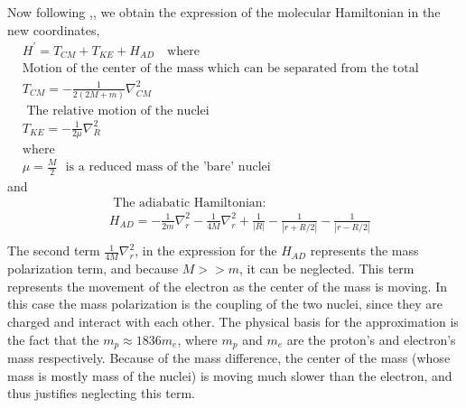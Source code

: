 Now following \cite{ZygelmanDalgarno1},\cite{Greg}, we obtain the expression of the molecular Hamiltonian in the new coordinates,
\begin{equation}
\begin{split}
& H^{'} = T_{CM} + T_{KE} + H_{AD} \,\,\,\,\text{ where } \\[.8em]
& \text{Motion of the center of the mass which can be separated from the total energy of the nuclei: } \\[.8em]
& T_{CM} = -\frac{1}{2(2M +m)}\nabla_{CM}^{2} \\[.8em]
& \text{ The relative motion of the nuclei } \\[.8em]
& T_{KE} = -\frac{1}{2\mu}\nabla_R^2 \\[.8em]
& \text{where} \\[.8em]
& \mu = \frac{M}{2}\,\,\text{ is a reduced mass of the 'bare' nuclei}
\end{split}
\end{equation}
and
\begin{equation}\label{HAD}
\begin{split}
    & \text{ The adiabatic Hamiltonian: } \\[.8em]
& H_{AD} = -\frac{1}{2m}\nabla_r^2 - \frac{1}{4M}\nabla_r^2 + \frac{1}{\left|R\right|} - \frac{1}{\left|r + R/2\right|} - \frac{1}{\left|r - R/2\right|} \\[.8em]
\end{split}
\end{equation}
The second term $ \frac{1}{4M}\nabla_r^2 $, in the expression for the $ H_{AD} $ represents the mass polarization term, and because $ M >> m $, it can be neglected. This term represents the movement of the electron as the center of the mass is moving. In this case the mass polarization is the coupling of the two nuclei, since they are charged and interact with each other. 
The physical basis for the approximation is the fact that the $ m_p \approx 1836 m_e $, where $ m_p $ and $ m_e $ are the proton's and electron's mass respectively. Because of the mass difference, the center of the mass (whose mass is mostly mass of the nuclei) is moving much slower than the electron, and thus justifies neglecting this term.

